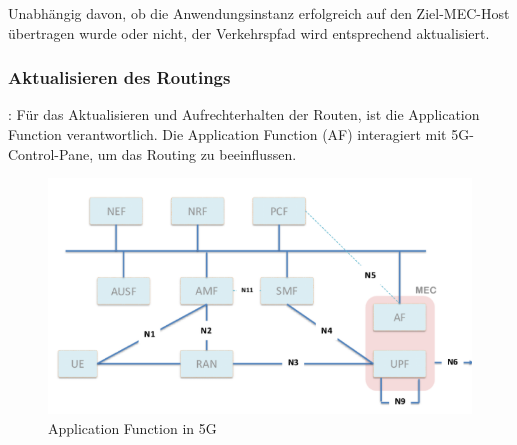 \documentclass[runningheads]{llncs}
\numberwithin{figure}{section}
\begin{document}
Unabhängig davon, ob die Anwendungsinstanz erfolgreich auf den Ziel-MEC-Host übertragen wurde oder nicht, 
der Verkehrspfad wird entsprechend aktualisiert.
\subsubsection{Aktualisieren des Routings}:
Für das Aktualisieren und Aufrechterhalten der Routen, ist die Application Function verantwortlich.
Die Application Function (AF) interagiert mit 5G-Control-Pane, 
um das Routing zu beeinflussen. 

\begin{figure}
  \includegraphics[width=\linewidth]{images/AF_5G.png}
  \caption{Application Function in 5G}
  \label{fig:AF_GG}
\end{figure}
\end{document}
